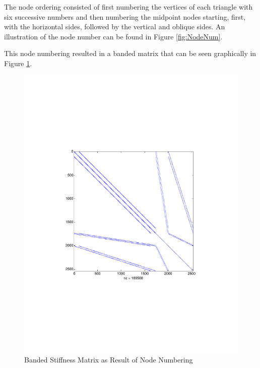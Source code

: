 The node ordering consisted of first numbering the vertices of each triangle
with six successive numbers and then numbering the midpoint nodes starting,
first, with the horizontal sides, followed by the vertical and oblique sides. An
illustration of the node number can be found in Figure \ref{fig:NodeNum}.



This node numbering resulted in a banded matrix that can be seen graphically in
Figure \ref{fig:MatrixGraph}.

\begin{figure}[h]
	\begin{center}
    \includegraphics[trim=100 235 100 250, clip, scale=0.5]{Matrix.pdf}
	\end{center}
  \caption{Banded Stiffness Matrix as Result of Node Numbering}
	\label{fig:MatrixGraph}
\end{figure}

